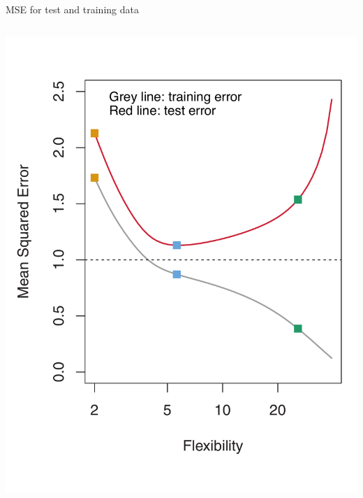 \documentclass[aspectratio=169]{beamer}
\begin{document}
\begin{frame}{MSE for test and training data}
\begin{columns}
\pause 
\includegraphics[scale=0.25]{figures/islr2_9b.pdf}
\end{columns}


\end{frame}
\end{document}
